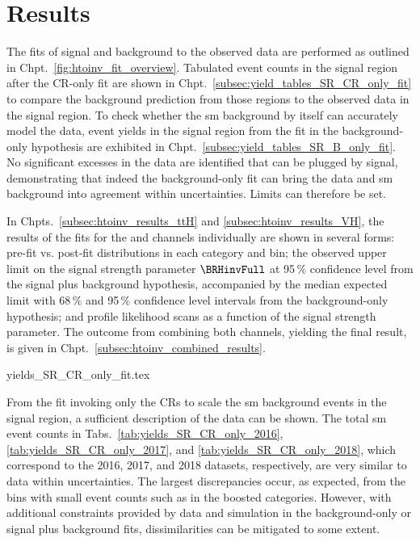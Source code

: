 \section{Results}
\label{sec:htoinv_results}

The fits of signal and background to the observed data are performed as outlined in Chpt.~\ref{fig:htoinv_fit_overview}. Tabulated event counts in the signal region after the \gls{CR}-only fit are shown in Chpt.~\ref{subsec:yield_tables_SR_CR_only_fit} to compare the background prediction from those regions to the observed data in the signal region. To check whether the \acrshort{sm} background by itself can accurately model the data, event yields in the signal region from the fit in the background-only hypothesis are exhibited in Chpt.~\ref{subsec:yield_tables_SR_B_only_fit}. No significant excesses in the data are identified that can be plugged by signal, demonstrating that indeed the background-only fit can bring the data and \acrshort{sm} background into agreement within uncertainties. Limits can therefore be set.

In Chpts.~\ref{subsec:htoinv_results_ttH} and \ref{subsec:htoinv_results_VH}, the results of the fits for the \ttH and \VH channels individually are shown in several forms: pre-fit vs. post-fit distributions in each category and \ptmiss bin; the observed upper limit on the signal strength parameter $\BRHinvFull$ at 95\,\% confidence level from the signal plus background hypothesis, accompanied by the median expected limit with 68\,\% and 95\,\% confidence level intervals from the background-only hypothesis; and profile likelihood scans as a function of the signal strength parameter. The outcome from combining both channels, yielding the final result, is given in Chpt.~\ref{subsec:htoinv_combined_results}.




{yields_SR_CR_only_fit.tex}

From the fit invoking only the \glspl{CR} to scale the \acrlong{sm} background events in the signal region, a sufficient description of the data can be shown. The total \acrshort{sm} event counts in Tabs.~\ref{tab:yields_SR_CR_only_2016}, \ref{tab:yields_SR_CR_only_2017}, and \ref{tab:yields_SR_CR_only_2018}, which correspond to the 2016, 2017, and 2018 datasets, respectively, are very similar to data within uncertainties. The largest discrepancies occur, as expected, from the bins with small event counts such as in the \ttH boosted categories. However, with additional constraints provided by data and simulation in the background-only or signal plus background fits, dissimilarities can be mitigated to some extent.

